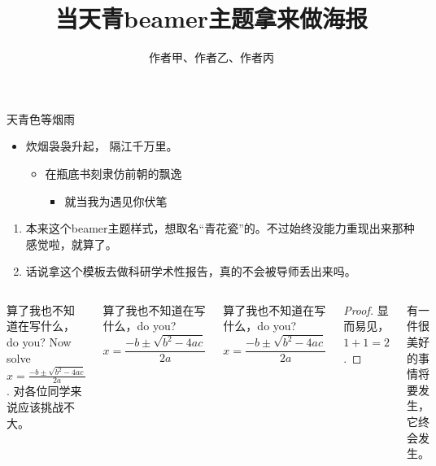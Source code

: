 \documentclass[t,linewidth=1.4]{ctexbeamer}
\title{当天青beamer主题拿来做海报}
\author{作者甲、作者乙、作者丙}
\begin{document}
\begin{frame}
    
\frametitle{\insertshorttitle}
\framesubtitle{\insertshortauthor}

\begin{block}{天青色等烟雨}
    \begin{itemize}
        \item 炊烟袅袅升起， 隔江千万里。
        \begin{itemize}
            \item 在瓶底书刻隶仿前朝的飘逸
            \begin{itemize}
                \item 就当我为遇见你伏笔
            \end{itemize}
        \end{itemize}
    \end{itemize}
    
    \begin{enumerate}
        \item 本来这个beamer主题样式，想取名“青花瓷”的。不过始终没能力重现出来那种感觉啦，就算了。
        \item 话说拿这个模板去做科研学术性报告，真的不会被导师丢出来吗。
    \end{enumerate}
\end{block}

\begin{columns}[T]
    
    \begin{exampleblock}{算了我也不知道在写什么，do you?}
        Now solve $x = \frac{-b \pm \sqrt{b^2 -4ac}}{2a}$. 对各位同学来说应该挑战不大。
    \end{exampleblock}
    
    \begin{alertblock}{算了我也不知道在写什么，do you?}
        \[ x = \frac{-b \pm \sqrt{b^2 -4ac}}{2a} \]
    \end{alertblock}
    
    \begin{block}{算了我也不知道在写什么，do you?}
        \[ x = \frac{-b \pm \sqrt{b^2 -4ac}}{2a} \]
    \end{block}
    
    \begin{proof}
        显而易见，$1+1=2$.
    \end{proof}
    
    \begin{theorem}
        有一件很美好的事情将要发生，它终会发生。
    \end{theorem}
    

\end{columns}
\end{frame}
\end{document}
